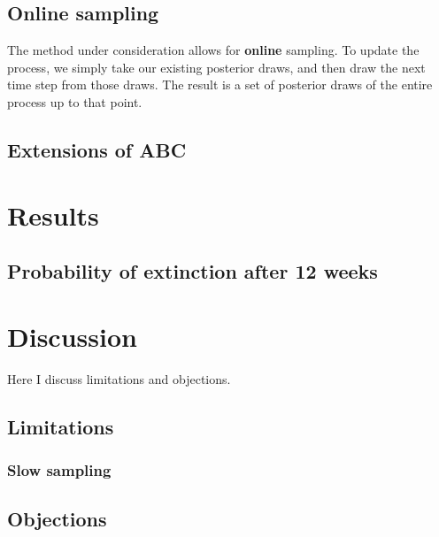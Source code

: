 \documentclass[
]{book}
\begin{document}
\hypertarget{online-sampling}{%
\subsection{Online sampling}\label{online-sampling}}

The method under consideration allows for \textbf{online} sampling. To update the process, we simply take our existing posterior draws, and then draw the next time step from those draws. The result is a set of posterior draws of the entire process up to that point.

\hypertarget{extensions-of-abc}{%
\subsection{Extensions of ABC}\label{extensions-of-abc}}

\hypertarget{results}{%
\section{Results}\label{results}}

\hypertarget{probability-of-extinction-after-12-weeks}{%
\subsection{Probability of extinction after 12 weeks}\label{probability-of-extinction-after-12-weeks}}

\hypertarget{discussion}{%
\section{Discussion}\label{discussion}}

Here I discuss limitations and objections.

\hypertarget{limitations}{%
\subsection{Limitations}\label{limitations}}

\hypertarget{slow-sampling}{%
\subsubsection{Slow sampling}\label{slow-sampling}}

\hypertarget{objections}{%
\subsection{Objections}\label{objections}}
\end{document}
